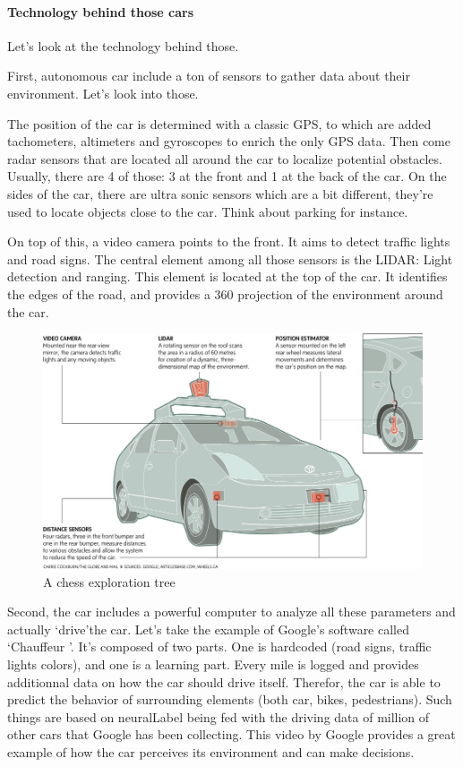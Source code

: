 \documentclass[12pt]{article}
\begin{document}
\paragraph{Technology behind those cars}

Let's look at the technology behind those.

First, autonomous car include a ton of sensors to gather data about their
environment. Let's look into those.

The position of the car is determined with a classic GPS, to which are added
tachometers, altimeters and gyroscopes to enrich the only GPS data. Then come
radar sensors that are located all around the car to localize potential
obstacles. Usually, there are 4 of those: 3 at the front and 1 at the back of
the car. On the sides of the car, there are ultra sonic sensors which are a bit
different, they're used to locate objects close to the car. Think about parking
for instance.

\noindent On top of this, a video camera points to the front. It aims to detect
traffic lights and road signs. The central element among all those sensors is
the LIDAR: Light detection and ranging. This element is located at the top of
the car. It identifies the edges of the road, and provides a 360 projection of
the environment around the car.

\smallskip

\begin{figure}[h]
    \centering
    \includegraphics[width=\linewidth]{car-diagram}
    \caption{A chess exploration tree}
    \label{fig:car}
\end{figure}

\smallskip

Second, the car includes a powerful computer to analyze all these parameters
and actually \lq drive\rq the car. Let's take the example of Google's software
called \lq Chauffeur \rq . It's composed of two parts. One is hardcoded
(road signs, traffic lights colors), and one is a learning part. Every mile is
logged and provides additionnal data on how the car should drive itself.
Therefor, the car is able to predict the behavior of surrounding elements
(both car, bikes, pedestrians). Such things are based on \gls{neuralLabel} being
fed with the driving data of million of other cars
that Google has been collecting. This video by Google provides a great example
of how the car perceives its environment and can make decisions.
\end{document}

